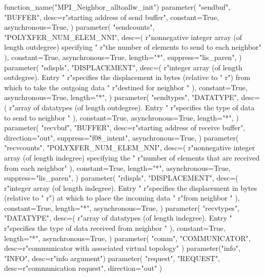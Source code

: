 \begin{mpi-binding}
    function_name("MPI_Neighbor_alltoallw_init")
    parameter(
        "sendbuf",
        "BUFFER",
        desc=r"starting address of send buffer",
        constant=True,
        asynchronous=True,
    )
    parameter(
        "sendcounts",
        "POLYXFER_NUM_ELEM_NNI",
        desc=(
            r"nonnegative integer array (of length outdegree) specifying "
            r"the number of elements to send to each neighbor"
        ),
        constant=True,
        asynchronous=True,
        length="*",
        suppress="lis_paren",
    )
    parameter(
        "sdispls",
        "DISPLACEMENT",
        desc=(
            r"integer array (of length outdegree). Entry  "
            r"specifies the displacement in bytes (relative to "
            r") from which to take the outgoing data "
            r"destined for neighbor "
        ),
        constant=True,
        asynchronous=True,
        length="*",
    )
    parameter(
        "sendtypes",
        "DATATYPE",
        desc=(
            r"array of datatypes (of length outdegree). Entry  "
            r"specifies the type of data to send to neighbor "
        ),
        constant=True,
        asynchronous=True,
        length="*",
    )
    parameter(
        "recvbuf",
        "BUFFER",
        desc=r"starting address of receive buffer",
        direction="out",
        suppress="f08_intent",
        asynchronous=True,
    )
    parameter(
        "recvcounts",
        "POLYXFER_NUM_ELEM_NNI",
        desc=(
            r"nonnegative integer array (of length indegree) specifying the "
            r"number of elements that are received from each neighbor"
        ),
        constant=True,
        length="*",
        asynchronous=True,
        suppress="lis_paren",
    )
    parameter(
        "rdispls",
        "DISPLACEMENT",
        desc=(
            r"integer array (of length indegree). Entry  "
            r"specifies the displacement in bytes (relative to "
            r") at which to place the incoming data "
            r"from neighbor "
        ),
        constant=True,
        length="*",
        asynchronous=True,
    )
    parameter(
        "recvtypes",
        "DATATYPE",
        desc=(
            r"array of datatypes (of length indegree). Entry  "
            r"specifies the type of data received from neighbor "
        ),
        constant=True,
        length="*",
        asynchronous=True,
    )
    parameter(
        "comm", "COMMUNICATOR", desc=r"communicator with associated virtual topology"
    )
    parameter("info", "INFO", desc=r"info argument")
    parameter(
        "request", "REQUEST", desc=r"communication request", direction="out"
    )
\end{mpi-binding}

